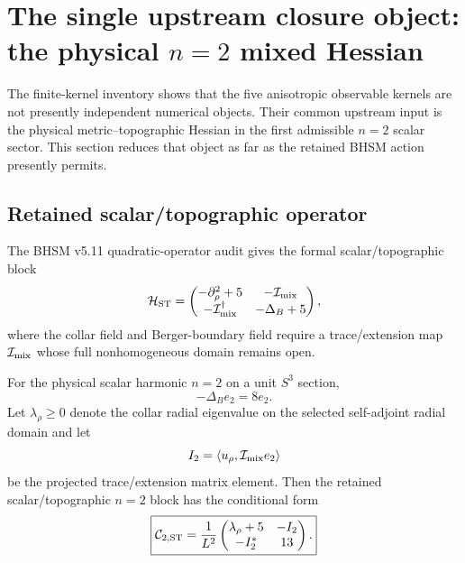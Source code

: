 \section{The single upstream closure object: the physical $n=2$ mixed Hessian}
\label{sec:bhsm-n2-mixed-hessian}

The finite-kernel inventory shows that the five anisotropic observable kernels
are not presently independent numerical objects.  Their common upstream
input is the physical metric--topographic Hessian in the first admissible
$n=2$ scalar sector.  This section reduces that object as far as the retained
BHSM action presently permits.

\subsection{Retained scalar/topographic operator}

The BHSM v5.11 quadratic-operator audit gives the formal scalar/topographic
block
\begin{equation}
\mathcal H_{\rm ST}
=
\begin{pmatrix}
-\partial_\rho^2+5 & -\mathcal I_{\rm mix}\\
-\mathcal I_{\rm mix}^\dagger & -\Delta_B+5
\end{pmatrix},
\label{eq:bhsm-ST-formal}
\end{equation}
where the collar field and Berger-boundary field require a trace/extension
map $\mathcal I_{\rm mix}$ whose full nonhomogeneous domain remains open.

For the physical scalar harmonic $n=2$ on a unit $S^3$ section,
\begin{equation}
-\Delta_B e_2=8e_2.
\end{equation}
Let $\lambda_\rho\ge0$ denote the collar radial eigenvalue on the selected
self-adjoint radial domain and let
\begin{equation}
I_2
=
\langle u_\rho,\mathcal I_{\rm mix}e_2\rangle
\end{equation}
be the projected trace/extension matrix element.  Then the retained
scalar/topographic $n=2$ block has the conditional form
\begin{equation}
\boxed{
\mathcal C_{2,\rm ST}
=
\frac1{L^2}
\begin{pmatrix}
\lambda_\rho+5 & -I_2\\
-I_2^\ast & 13
\end{pmatrix}.
}
\label{eq:C2-ST}
\end{equation}

